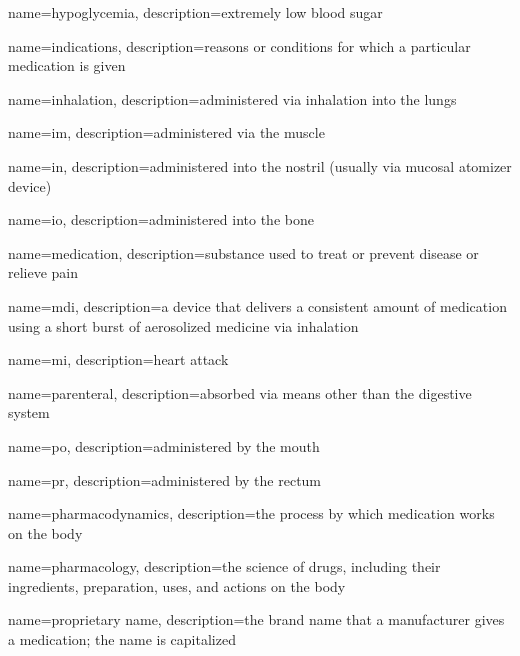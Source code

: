 \documentclass[../../EMT-169.tex]{subfiles}
\begin{document}
	{
		name=hypoglycemia,
		description={extremely low blood sugar}
	}

	{
		name=indications,
		description={reasons or conditions for which a particular medication is given}
	}

	{
		name=inhalation,
		description={administered via inhalation into the lungs}
	}

	{
		name=\acrfull{im},
		description={administered via the muscle}
	}

	{
		name=\acrfull{in},
		description={administered into the nostril (usually via mucosal atomizer device)}
	}

	{
		name=\acrfull{io},
		description={administered into the bone}
	}

	
	{
		name=medication,
		description={substance used to treat or prevent disease or relieve pain}
	}

	{
		name=\acrfull{mdi},
		description={a device that delivers a consistent amount of medication using a short burst of aerosolized medicine via inhalation}
	}

	{
		name=\acrfull{mi},
		description={heart attack}
	}

	{
		name=parenteral,
		description={absorbed via means other than the digestive system}
	}

	{
		name=\acrfull{po},
		description={administered by the mouth}
	}

	{
		name=\acrfull{pr},
		description={administered by the rectum}
	}

	{
		name=pharmacodynamics,
		description={the process by which medication works on the body}
	}

	{
		name=pharmacology,
		description={the science of drugs, including their ingredients, preparation, uses, and actions on the body}
	}

	{
		name=proprietary name,
		description={the brand name that a manufacturer gives a medication; the name is capitalized}
	}
\end{document}
